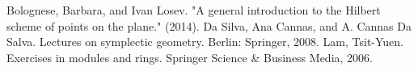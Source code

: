 
\begin{thebibliography}{10}
  Bolognese, Barbara, and Ivan Losev. "A general introduction to the Hilbert scheme of points on the plane." (2014).
 Da Silva, Ana Cannas, and A. Cannas Da Salva. Lectures on symplectic geometry. Berlin: Springer, 2008.
 Lam, Tsit-Yuen. Exercises in modules and rings. Springer Science & Business Media, 2006.
\end{thebibliography}
